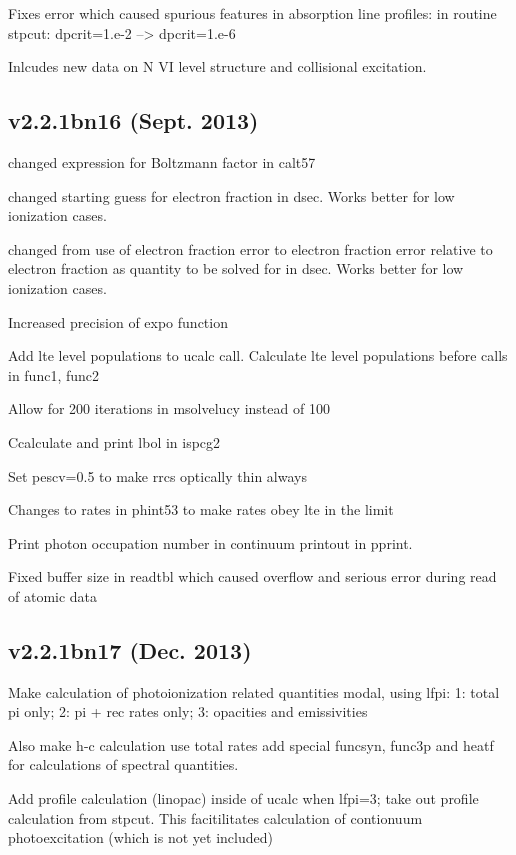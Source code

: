 Fixes error which caused spurious features in absorption line profiles:
   in routine stpcut:  dpcrit=1.e-2 -->  dpcrit=1.e-6

Inlcudes new data on N VI level structure and collisional excitation.

\subsection{v2.2.1bn16 (Sept. 2013)}

changed expression for Boltzmann factor in calt57

changed starting guess for electron fraction in dsec.  Works better for 
  low ionization cases.

changed from use of electron fraction error to electron fraction error 
  relative to electron fraction as quantity to be solved for  in dsec.  
  Works better for low ionization cases.

Increased precision of expo function

Add lte level populations to ucalc call.  Calculate lte level populations
  before calls in func1, func2

Allow for 200 iterations in msolvelucy instead of 100

Ccalculate and print lbol in ispcg2

Set pescv=0.5 to make rrcs optically thin always

Changes to rates in phint53 to make rates obey lte in the limit

Print photon occupation number in continuum printout in pprint.

Fixed buffer size in readtbl which caused overflow and serious error 
   during read of atomic data

\subsection{v2.2.1bn17 (Dec. 2013)}

Make calculation of photoionization related quantities modal, using  lfpi:  
   1: total pi only; 
   2: pi + rec rates only; 
   3: opacities and emissivities

Also make h-c calculation use total rates
   add special funcsyn, func3p and heatf for calculations 
   of spectral quantities. 

Add profile calculation (linopac) inside of ucalc when lfpi=3; take out 
   profile calculation from stpcut.  
   This facitilitates calculation of contionuum photoexcitation 
   (which is not yet included)

